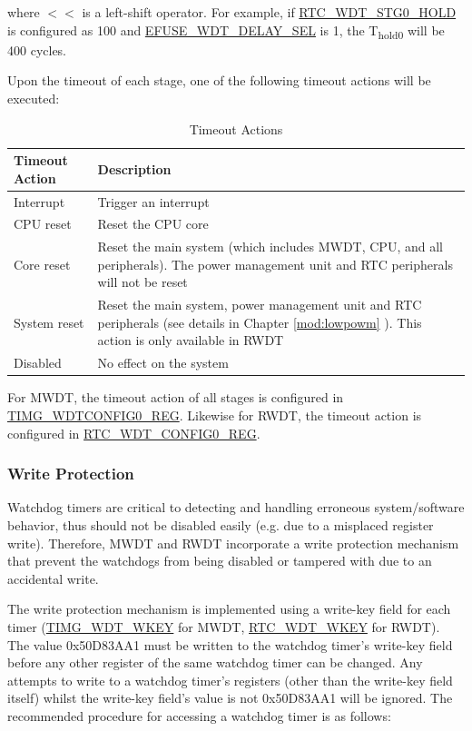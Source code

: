 \documentclass[main\_\_EN.tex]{subfiles}
\begin{document}
where $<<$ is a left-shift operator. For example, if \hyperref[fielddesc:RTCWDTSTG0HOLD]{RTC\_WDT\_STG0\_HOLD} is configured as 100 and \hyperref[fielddesc:EFUSEWDTDELAYSEL]{EFUSE\_WDT\_DELAY\_SEL} is 1, the T\textsubscript{hold0} will be 400 cycles.

Upon the timeout of each stage, one of the following timeout actions will be executed:

\begin{table}[H]
\centering
\caption{Timeout Actions}
\label{tab:wdt-timeout-action}

\begin{tabular}{|l|m{12cm}|}
\hline
\rowcolor{lightgray}
    \textbf{Timeout Action} & \textbf{Description} \\\hline

    Interrupt &  Trigger an interrupt \\ \hline
    CPU reset &  Reset the CPU core \\ \hline
    Core reset &  Reset the main system (which includes MWDT, CPU, and all peripherals). The power management unit and RTC peripherals will not be reset \\ \hline
    System reset &  Reset the main system, power management unit and RTC peripherals (see details in Chapter \ref{mod:lowpowm} \textit{\nameref{mod:lowpowm}}). This action is only available in RWDT  \\ \hline
    Disabled &  No effect on the system \\ \hline

\end{tabular}
\end{table}

For MWDT, the timeout action of all stages is configured in \hyperref[regdesc:TIMGWDTCONFIG0REG]{TIMG\_WDTCONFIG0\_REG}. Likewise for RWDT, the timeout action is configured in \hyperref[regdesc:RTCWDTCONFIG0REG]{RTC\_WDT\_CONFIG0\_REG}.

\subsubsection{Write Protection}
Watchdog timers are critical to detecting and handling erroneous system/software behavior, thus should not be disabled easily (e.g. due to a misplaced register write). Therefore, MWDT and RWDT incorporate a write protection mechanism that prevent the watchdogs from being disabled or tampered with due to an accidental write.

The write protection mechanism is implemented using a write-key field for each timer (\hyperref[fielddesc:TIMGWDTWKEY]{TIMG\_WDT\_WKEY} for MWDT, \hyperref[fielddesc:RTCWDTWKEY]{RTC\_WDT\_WKEY} for RWDT). The value 0x50D83AA1 must be written to the watchdog timer’s write-key field before any other register of the same watchdog timer can be changed. Any attempts to write to a watchdog timer’s registers (other than the write-key field itself) whilst the write-key field’s value is not 0x50D83AA1 will be ignored. The recommended procedure for accessing a watchdog timer is as follows:
\end{document}
